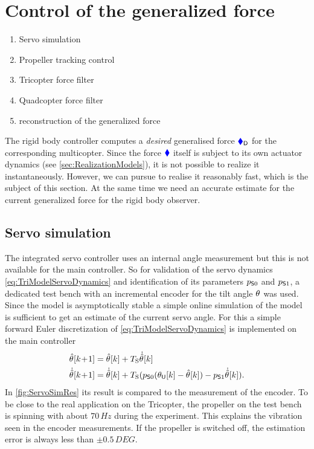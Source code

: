 \section{Control of the generalized force}\label{sec:RealizationForceVectorControl}

\begin{enumerate}
 \item Servo simulation
 \item Propeller tracking control
 \item Tricopter force filter
 \item Quadcopter force filter
 \item reconstruction of the generalized force
\end{enumerate}


The rigid body controller computes a \textit{desired} generalised force $\genForceD$ for the corresponding multicopter.
Since the force $\genForce$ itself is subject to its own actuator dynamics (see \autoref{sec:RealizationModels}), it is not possible to realize it instantaneously.
However, we can pursue to realise it reasonably fast, which is the subject of this section.
At the same time we need an accurate estimate for the current generalized force for the rigid body observer.

\subsection{Servo simulation}
The integrated servo controller uses an internal angle measurement but this is not available for the main controller.
So for validation of the servo dynamics \eqref{eq:TriModelServoDynamics} and identification of its parameters $\ServoParam[0]$ and $\ServoParam[1] $, a dedicated test bench with an incremental encoder for the tilt angle $\aServo$ was used.
Since the model is asymptotically stable a simple online simulation of the model is sufficient to get an estimate of the current servo angle.
For this a simple forward Euler discretization of \eqref{eq:TriModelServoDynamics} is implemented on the main controller
\begin{subequations}\label{eq:ServoSimulator}
\begin{align}
 \aServoObs[][k\!+\!1] &= \aServoObs[][k] + \Ts \aServoObsd[][k]
\\
 \aServoObsd[][k\!+\!1] &= \aServoObsd[][k] + \Ts( \ServoParam[0] (\aServoU[][k] - \aServoObs[][k]) - \ServoParam[1] \aServoObsd[][k])
 .
\end{align}
\end{subequations}
In \autoref{fig:ServoSimRes} its result is compared to the measurement of the encoder.
To be close to the real application on the Tricopter, the propeller on the test bench is spinning with about $70\,\unit{Hz}$ during the experiment.
This explains the vibration seen in the encoder measurements.
If the propeller is switched off, the estimation error is always less than $\pm 0.5\,\unit{DEG}$.

